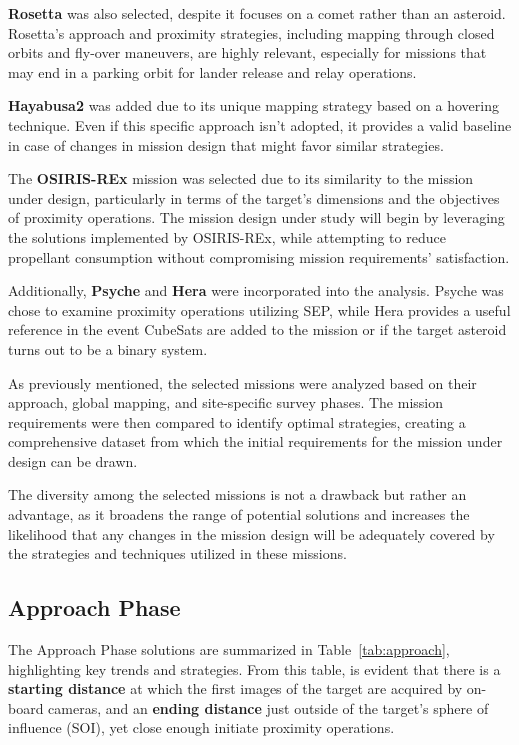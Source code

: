 \documentclass{Configuration_gigi/PoliMi3i_thesis}
\begin{document}
\textbf{Rosetta} was also selected, despite it focuses on a comet rather than an asteroid. Rosetta's approach and proximity strategies, including mapping through closed orbits and fly-over maneuvers, are highly relevant, especially for missions that may end in a parking orbit for lander release and relay operations. 

\textbf{Hayabusa2} was added due to its unique mapping strategy based on a hovering technique. Even if this specific approach isn't adopted, it provides a valid baseline in case of changes in mission design that might favor similar strategies.

The \textbf{OSIRIS-REx} mission was selected due to its similarity to the mission under design, particularly in terms of the target's dimensions and the objectives of proximity operations. The mission design under study will begin by leveraging the solutions implemented by OSIRIS-REx, while attempting to reduce propellant consumption without compromising mission requirements' satisfaction.

Additionally, \textbf{Psyche} and \textbf{Hera} were incorporated into the analysis. Psyche was chose to examine proximity operations utilizing SEP, while Hera provides a useful reference in the event CubeSats are added to the mission or if the target asteroid turns out to be a binary system.

As previously mentioned, the selected missions were analyzed based on their approach, global mapping, and site-specific survey phases. The mission requirements were then compared to identify optimal strategies, creating a comprehensive dataset from which the initial requirements for the mission under design can be drawn.

The diversity among the selected missions is not a drawback but rather an advantage, as it broadens the range of potential solutions and increases the likelihood that any changes in the mission design will be adequately covered by the strategies and techniques utilized in these missions.


\subsection{Approach Phase}\label{Ssec:Approach Phase}

The Approach Phase solutions are summarized in Table~\ref{tab:approach}, highlighting key trends and strategies. From this table, is evident that there is a \textbf{starting distance} at which the first images of the target are acquired by on-board cameras, and an \textbf{ending distance} just outside of the target's sphere of influence (SOI), yet close enough initiate proximity operations. 
\end{document}
